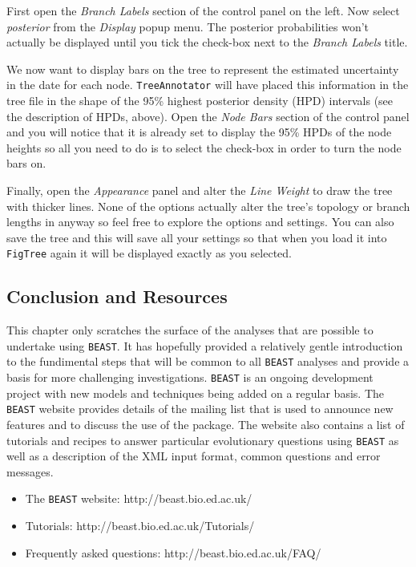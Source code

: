 \documentclass[cup7b, english]{cupbook}
\begin{document}
First open the {\it Branch Labels} section of
the control panel on the left. Now select {\it posterior} from the {\it Display} popup menu. The
posterior probabilities won't actually be displayed until you tick the check-box next to the
{\it Branch Labels} title.

We now want to display bars on the tree to represent the estimated uncertainty in the date for
each node. \texttt{TreeAnnotator} will have placed this information in the tree file in the shape of the
95\% highest posterior density (HPD) intervals (see the description of HPDs, above). Open the
{\it Node Bars} section of the control panel and you will notice that it is already
set to display the 95\% HPDs of the node heights so all you need to do is to select the check-box in
order to turn the node bars on.

Finally, open the {\it Appearance} panel and alter the {\it Line Weight} to draw the tree with thicker
lines. None of the options actually alter the tree's topology or branch lengths in anyway so feel free
to explore the options and settings. You can also save the tree and this will save all your settings
so that when you load it into \texttt{FigTree} again it will be displayed exactly as you selected.

\subsection{Conclusion and Resources}

This chapter only scratches the surface of the analyses that are possible to undertake using
\texttt{BEAST}. It has hopefully provided a relatively gentle introduction to the fundimental steps that will
be common to all \texttt{BEAST} analyses and provide a basis for more challenging investigations. \texttt{BEAST} is an
ongoing development project with new models and techniques being added on a regular basis. The \texttt{BEAST} website
provides details of the mailing list that is used to announce new features and to discuss the use
of the package. The website also contains a list of tutorials and recipes
 to answer particular evolutionary questions using \texttt{BEAST} as well as a description of the XML
input format, common questions and error messages.

 \begin{itemize}
 \item The \texttt{BEAST} website:
 http://beast.bio.ed.ac.uk/
 \item Tutorials:
 http://beast.bio.ed.ac.uk/Tutorials/
 \item Frequently asked questions:
 http://beast.bio.ed.ac.uk/FAQ/
 \end{itemize}
\end{document}
